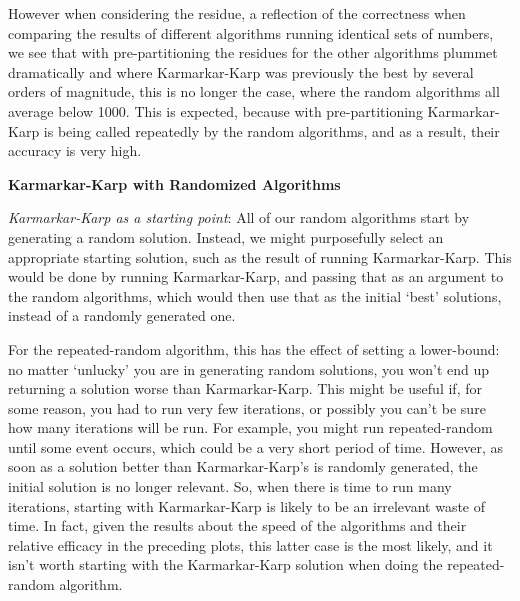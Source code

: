 \documentclass[12pt]{article}
\begin{document}
 \noindent However when considering the residue, a reflection of the correctness when comparing the results of different algorithms running identical sets of numbers, we see that with pre-partitioning the residues for the other algorithms plummet dramatically and where Karmarkar-Karp was previously the best by several orders of magnitude, this is no longer the case, where the random algorithms all average below 1000.  This is expected, because with pre-partitioning Karmarkar-Karp is being called repeatedly by the random algorithms, and as a result, their accuracy is very high.
 \medskip
 
 \noindent \textbf{Karmarkar-Karp with Randomized Algorithms}
\medskip
 
 \noindent \emph{Karmarkar-Karp as a starting point}: All of our random algorithms start by generating a random solution. Instead, we might purposefully select an appropriate starting solution, such as the result of running Karmarkar-Karp. This would be done by running Karmarkar-Karp, and passing that as an argument to the random algorithms, which would then use that as the initial `best' solutions, instead of a randomly generated one.

For the repeated-random algorithm, this has the effect of setting a lower-bound: no matter `unlucky' you are in generating random solutions, you won't end up returning a solution worse than Karmarkar-Karp. This might be useful if, for some reason, you had to run very few iterations, or possibly you can't be sure how many iterations will be run. For example, you might run repeated-random until some event occurs, which could be a very short period of time. However, as soon as a solution better than Karmarkar-Karp's is randomly generated, the initial solution is no longer relevant. So, when there is time to run many iterations, starting with Karmarkar-Karp is likely to be an irrelevant waste of time. In fact, given the results about the speed of the algorithms and their relative efficacy in the preceding plots, this latter case is the most likely, and it isn't worth starting with the Karmarkar-Karp solution when doing the repeated-random algorithm.
\end{document}
